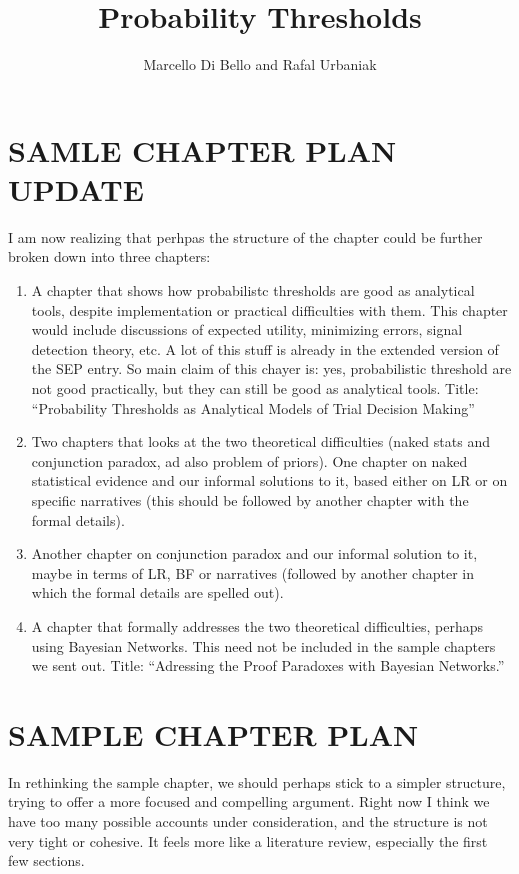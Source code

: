 \documentclass[
  10pt,
  dvipsnames,enabledeprecatedfontcommands]{scrartcl}
\title{Probability Thresholds}
\author{Marcello Di Bello and Rafal Urbaniak}
\date{}
\begin{document}
\maketitle

\section*{SAMLE CHAPTER PLAN UPDATE}

I am now realizing that perhpas the structure of the chapter could be
further broken down into three chapters:

\begin{enumerate}
\def\labelenumi{\arabic{enumi}.}
\item
  A chapter that shows how probabilistc thresholds are good as
  analytical tools, despite implementation or practical difficulties
  with them. This chapter would include discussions of expected utility,
  minimizing errors, signal detection theory, etc. A lot of this stuff
  is already in the extended version of the SEP entry. So main claim of
  this chayer is: yes, probabilistic threshold are not good practically,
  but they can still be good as analytical tools. Title: ``Probability
  Thresholds as Analytical Models of Trial Decision Making''
\item
  Two chapters that looks at the two theoretical difficulties (naked
  stats and conjunction paradox, ad also problem of priors). One chapter
  on naked statistical evidence and our informal solutions to it, based
  either on LR or on specific narratives (this should be followed by
  another chapter with the formal details).
\item
  Another chapter on conjunction paradox and our informal solution to
  it, maybe in terms of LR, BF or narratives (followed by another
  chapter in which the formal details are spelled out).
\item
  A chapter that formally addresses the two theoretical difficulties,
  perhaps using Bayesian Networks. This need not be included in the
  sample chapters we sent out. Title: ``Adressing the Proof Paradoxes
  with Bayesian Networks.''
\end{enumerate}

\section*{SAMPLE CHAPTER PLAN}

In rethinking the sample chapter, we should perhaps stick to a simpler
structure, trying to offer a more focused and compelling argument. Right
now I think we have too many possible accounts under consideration, and
the structure is not very tight or cohesive. It feels more like a
literature review, especially the first few sections.
\end{document}
